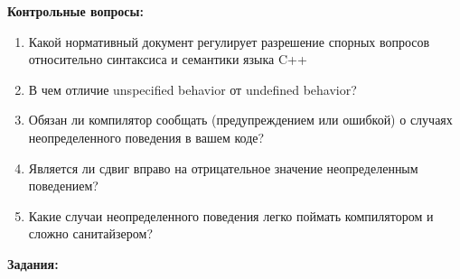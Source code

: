 \documentclass[a4paper,12pt,oneside]{article}
\begin{document}
\textbf{Контрольные вопросы:} 

\begin{enumerate}
\item Какой нормативный документ регулирует разрешение спорных вопросов относительно синтаксиса и семантики языка C++
\item В чем отличие unspecified behavior от undefined behavior?
\item Обязан ли компилятор сообщать (предупреждением или ошибкой) о случаях неопределенного поведения в вашем коде?
\item Является ли сдвиг вправо на отрицательное значение неопределенным поведением?
\item Какие случаи неопределенного поведения легко поймать компилятором и сложно санитайзером? 
\end{enumerate}

\textbf{Задания:} 
\end{document}
